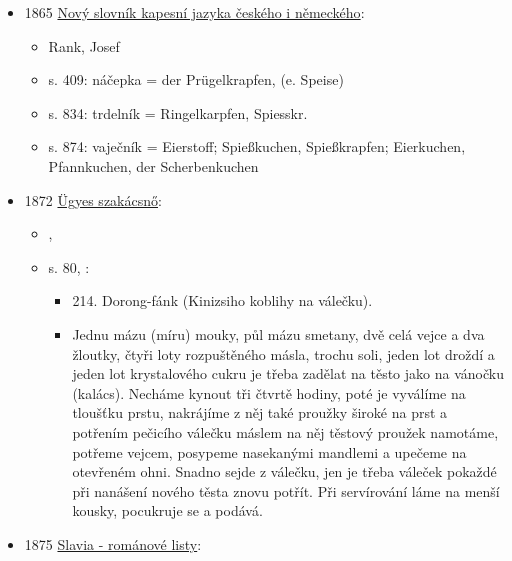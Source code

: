 \begin{itemize}
  \begin{itemize}
  \tightlist
  \item
    Nemírnost v jídle ženské hanácké osoby
  \item
    přepis básničky od Gallaše z Muz Morawských
  \end{itemize}
\item
  1865
  \href{https://ceskadigitalniknihovna.cz/uuid/uuid:a738d13c-8062-4352-9707-b5ae338b4873}{Nový
  slovník kapesní jazyka českého i německého}:

  \begin{itemize}
  \tightlist
  \item
    Rank, Josef
  \item
    s. 409: náčepka = der Prügelkrapfen, (e. Speise)
  \item
    s. 834: trdelník = Ringelkarpfen, Spiesskr.
  \item
    s. 874: vaječník = Eierstoff; Spießkuchen, Spießkrapfen; Eierkuchen,
    Pfannkuchen, der Scherbenkuchen
  \end{itemize}
\item
  1872
  \href{https://web.archive.org/web/20201229075652/http://www.kurtos.eu/dl/ugyes_szakacsno.pdf}{Ügyes
  szakácsnő}:

  \begin{itemize}
  \tightlist
  \item
     , 
  \item
    s. 80,  :

    \begin{itemize}
    \tightlist
    \item
      214. Dorong-fánk (Kinizsiho koblihy na válečku).
    \item
      Jednu mázu (míru) mouky, půl mázu smetany, dvě celá vejce a dva
      žloutky, čtyři loty rozpuštěného másla, trochu soli, jeden lot
      droždí a jeden lot krystalového cukru je třeba zadělat na těsto
      jako na vánočku (kalács). Necháme kynout tři čtvrtě hodiny, poté
      je vyválíme na tloušťku prstu, nakrájíme z něj také proužky široké
      na prst a potřením pečicího válečku máslem na něj těstový proužek
      namotáme, potřeme vejcem, posypeme nasekanými mandlemi a upečeme
      na otevřeném ohni. Snadno sejde z válečku, jen je třeba váleček
      pokaždé při nanášení nového těsta znovu potřít. Při servírování
      láme na menší kousky, pocukruje se a podává.
    \end{itemize}
  \end{itemize}
\item
  1875
  \href{https://www.google.cz/books/edition/Slavia/WrJiAAAAcAAJ?hl=cs&gbpv=1&dq=trdeln\%C3\%ADk&pg=PA312&printsec=frontcover}{Slavia
  - románové listy}:


\end{itemize}
